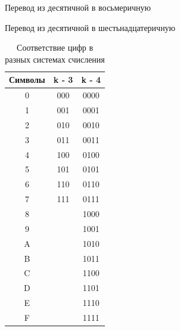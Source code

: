 \documentclass[10pt,pdf,hyperref={unicode}]{beamer}%
\begin{document}
\begin{frame}{Перевод из десятичной в восьмеричную}
  \begin{figure}[h]
  \end{figure}
\end{frame}

\begin{frame}{Перевод из десятичной в шестьнадцатеричную}
  \begin{figure}[h]
  \end{figure}
\end{frame}


\begin{frame}
  \begin{table}[h]
  \caption{Соответствие цифр в разных системах счисления}
  \begin{center}\label{tab:octhex}
    \begin{tabular}{|c|c|c|}
      \hline
     Символы & k - 3 & k - 4 \\
     \hline
      0 & 000 & 0000 \\
      1 & 001 & 0001 \\
      2 & 010 & 0010 \\
      3 & 011 & 0011 \\
      4 & 100 & 0100 \\
      5 & 101 & 0101 \\
      6 & 110 & 0110 \\
      7 & 111 & 0111 \\
      8 &     & 1000 \\
      9 &     & 1001 \\
      A &     & 1010 \\
      B &     & 1011 \\
      C &     & 1100 \\
      D &     & 1101 \\
      E &     & 1110 \\
      F &     & 1111 \\
      \hline
     \end{tabular}
  \end{center}
\end{table}

\end{frame}
\end{document}
